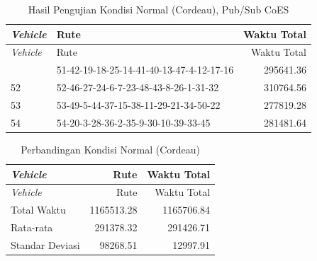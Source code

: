 \begin{longtable}[!]{lp{8cm}r}
	\caption{Hasil Pengujian Kondisi Normal (Cordeau), Pub/Sub CoES}
	\label{tbl:test_result_normal_cordeau_pubsub_coes}\\
	\toprule
		\textit{Vehicle} & Rute & Waktu Total\\ 
	\midrule
	\endfirsthead
	\toprule
		\textit{Vehicle} & Rute & Waktu Total\\ 
	\midrule
	\endhead
	\bottomrule
	\endfoot
		51 & 51-42-19-18-25-14-41-40-13-47-4-12-17-16 & 295641.36 \\
		52 & 52-46-27-24-6-7-23-48-43-8-26-1-31-32 & 310764.56 \\
		53 & 53-49-5-44-37-15-38-11-29-21-34-50-22 & 277819.28 \\
		54 & 54-20-3-28-36-2-35-9-30-10-39-33-45 & 281481.64 \\
\end{longtable}


\begin{longtable}[!]{lrr}
	\caption{Perbandingan Kondisi Normal (Cordeau)}
	\label{tbl:test_result_normal_cordeau_comparison}\\
	\toprule
		\textit{Vehicle} & Rute & Waktu Total\\ 
	\midrule
	\endfirsthead
	\toprule
		\textit{Vehicle} & Rute & Waktu Total\\ 
	\midrule
	\endhead
	\bottomrule
	\endfoot
		Total Waktu & 1165513.28 & 1165706.84\\
		Rata-rata & 291378.32 & 291426.71\\
		Standar Deviasi & 98268.51 & 12997.91\\
\end{longtable}


